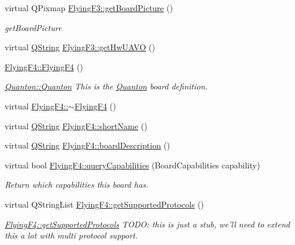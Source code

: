 \begin{DoxyCompactItemize}
virtual \-Q\-Pixmap \hyperlink{group___boards___stm_ga7639046444dbf061bc2c2402d8ebc05e}{\-Flying\-F3\-::get\-Board\-Picture} ()
\begin{DoxyCompactList}\small\item\em get\-Board\-Picture \end{DoxyCompactList}\item 
virtual \hyperlink{group___u_a_v_objects_plugin_gab9d252f49c333c94a72f97ce3105a32d}{\-Q\-String} \hyperlink{group___boards___stm_gaa65745b439471a9a0c381fef5f5991c3}{\-Flying\-F3\-::get\-Hw\-U\-A\-V\-O} ()
\item 
\hyperlink{group___boards___stm_ga520fa9de4d28a0754a9ea798a89e3b56}{\-Flying\-F4\-::\-Flying\-F4} ()
\begin{DoxyCompactList}\small\item\em \hyperlink{group___boards___quantec_ga39ce601b1744d463fc4a56681c46135f}{\-Quanton\-::\-Quanton} \-This is the \hyperlink{class_quanton}{\-Quanton} board definition. \end{DoxyCompactList}\item 
virtual \hyperlink{group___boards___stm_ga901ea50bfeb75a8d451c5fa8f303f8b5}{\-Flying\-F4\-::$\sim$\-Flying\-F4} ()
\item 
virtual \hyperlink{group___u_a_v_objects_plugin_gab9d252f49c333c94a72f97ce3105a32d}{\-Q\-String} \hyperlink{group___boards___stm_ga779f6089f1d7444e4a5aad46aa1eec56}{\-Flying\-F4\-::short\-Name} ()
\item 
virtual \hyperlink{group___u_a_v_objects_plugin_gab9d252f49c333c94a72f97ce3105a32d}{\-Q\-String} \hyperlink{group___boards___stm_gaf26e4b2a68ac23e2d7aaa38e1efedc61}{\-Flying\-F4\-::board\-Description} ()
\item 
virtual bool \hyperlink{group___boards___stm_gae8c3f46dea83e638e7b1e9c00658cae6}{\-Flying\-F4\-::query\-Capabilities} (\-Board\-Capabilities capability)
\begin{DoxyCompactList}\small\item\em \-Return which capabilities this board has. \end{DoxyCompactList}\item 
virtual \-Q\-String\-List \hyperlink{group___boards___stm_ga414c6ad3220b62ad6230c97f000bfbac}{\-Flying\-F4\-::get\-Supported\-Protocols} ()
\begin{DoxyCompactList}\small\item\em \hyperlink{group___boards___stm_ga414c6ad3220b62ad6230c97f000bfbac}{\-Flying\-F4\-::get\-Supported\-Protocols} \-T\-O\-D\-O\-: this is just a stub, we'll need to extend this a lot with multi protocol support. \end{DoxyCompactList}\item 

\end{DoxyCompactItemize}
